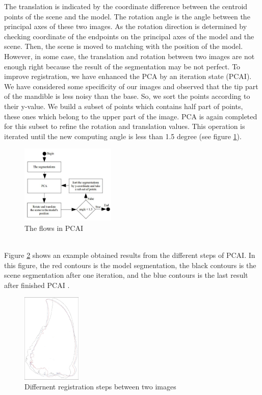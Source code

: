 \documentclass[twoside,twocolumn,10pt]{article}
\begin{document}
The translation is indicated by the coordinate difference between the centroid points of the scene and the model. The rotation angle is the angle between the principal axes of these two images. As the rotation direction is determined by checking coordinate of the endpoints on the principal axes of the model and the scene. Then, the scene is moved to matching with the position of the model. However,
in some case, the translation and rotation between two images are
not enough right because the result of the segmentation may be not perfect. To improve registration, we have enhanced the PCA by an iteration state (PCAI). We have considered some specificity of our images and observed that the tip part of the mandible is less noisy than the base. So, we sort the points according to their y-value. We build a subset of points which contains half part of points, these ones which belong to the upper part of the image. PCA is again completed for this subset to refine the rotation and translation values. This operation is iterated until the new computing angle is less than 1.5 degree (see figure \ref{fig:pcai}).
\begin{figure}[htb]
    \centering
    \includegraphics[width=0.4\textwidth]{./images/pcadiagram}
    \caption{The flows in PCAI}
    \label{fig:pcai}
\end{figure}~\\
Figure \ref{fig:box} shows an example obtained results from the different steps of PCAI. In this figure, the red contours is the model segmentation, the black contours is the scene segmentation after one iteration, and the blue contours is the last result after finished PCAI .\\

\begin{figure}[htb]
    \centering
    \includegraphics[width=0.25\textwidth]{./images/imreg}
    \caption{Differnent registration steps between two images}
    \label{fig:box}
\end{figure}
\end{document}
